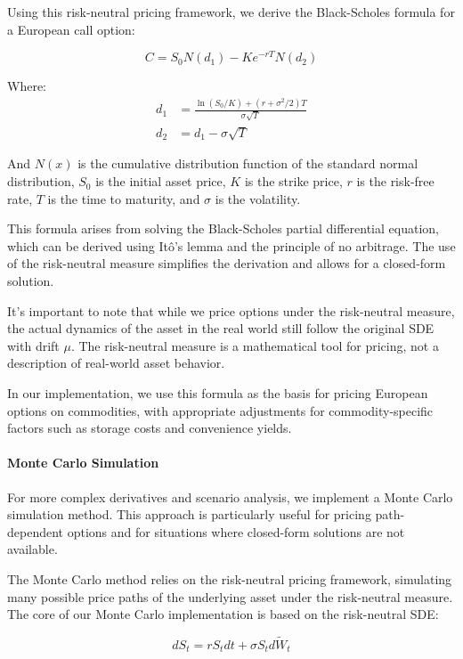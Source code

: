 \documentclass[12pt]{article}
\begin{document}
Using this risk-neutral pricing framework, we derive the Black-Scholes formula for a European call option:

\begin{equation}
    C = S_0 N(d_1) - Ke^{-rT} N(d_2)
\end{equation}

Where:
\begin{align*}
    d_1 &= \frac{\ln(S_0/K) + (r + \sigma^2/2)T}{\sigma\sqrt{T}} \\
    d_2 &= d_1 - \sigma\sqrt{T}
\end{align*}

And $N(x)$ is the cumulative distribution function of the standard normal distribution, $S_0$ is the initial asset price, $K$ is the strike price, $r$ is the risk-free rate, $T$ is the time to maturity, and $\sigma$ is the volatility.

This formula arises from solving the Black-Scholes partial differential equation, which can be derived using Itô's lemma and the principle of no arbitrage. The use of the risk-neutral measure simplifies the derivation and allows for a closed-form solution.

It's important to note that while we price options under the risk-neutral measure, the actual dynamics of the asset in the real world still follow the original SDE with drift $\mu$. The risk-neutral measure is a mathematical tool for pricing, not a description of real-world asset behavior.

In our implementation, we use this formula as the basis for pricing European options on commodities, with appropriate adjustments for commodity-specific factors such as storage costs and convenience yields.

\paragraph{Monte Carlo Simulation}

For more complex derivatives and scenario analysis, we implement a Monte Carlo simulation method. This approach is particularly useful for pricing path-dependent options and for situations where closed-form solutions are not available.

The Monte Carlo method relies on the risk-neutral pricing framework, simulating many possible price paths of the underlying asset under the risk-neutral measure. The core of our Monte Carlo implementation is based on the risk-neutral SDE:

\begin{equation}
    dS_t = r S_t dt + \sigma S_t d\tilde{W}_t
\end{equation}
\end{document}
